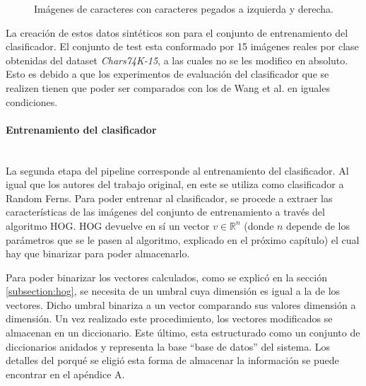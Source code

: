 		\begin{figure}[htbp]
			\centering
			\caption[Caracteres pegados]{Imágenes de caracteres con caracteres pegados a izquierda y derecha.}
			\label{fig: Imagen anexos}
		\end{figure}

			La creación de estos datos sintéticos son para el conjunto de entrenamiento del clasificador. El conjunto de test esta conformado por 15 imágenes reales por clase obtenidas del dataset \textit{Chars74K-15}, a las cuales no se les modifico en absoluto. Esto es debido a que los experimentos de evaluación del clasificador que se realizen tienen que poder ser comparados con los de Wang et al. en iguales condiciones.


		\paragraph{Entrenamiento del clasificador}  ~\\

			La segunda etapa del pipeline corresponde al entrenamiento del clasificador. Al igual que los autores del trabajo original, en este se utiliza como clasificador a Random Ferns. Para poder entrenar al clasificador, se procede a extraer las características de las imágenes del conjunto de entrenamiento a través del algoritmo HOG. HOG devuelve en sí un vector $v \in \mathbb{R}^{n}$ (donde $n$ depende de los parámetros que se le pasen al algoritmo, explicado en el próximo capítulo) el cual hay que binarizar para poder almacenarlo.

			Para poder binarizar los vectores calculados, como se explicó en la sección \ref{subsection:hog}, se necesita de un umbral cuya dimensión es igual a la de los vectores. Dicho umbral binariza a un vector comparando sus valores dimensión a dimensión. Un vez realizado este procedimiento, los vectores modificados se almacenan en un diccionario. Este último, esta estructurado como un conjunto de diccionarios anidados y representa la base ``base de datos'' del sistema. Los detalles del porqué se eligió esta forma de almacenar la información se puede encontrar en el apéndice A. 

